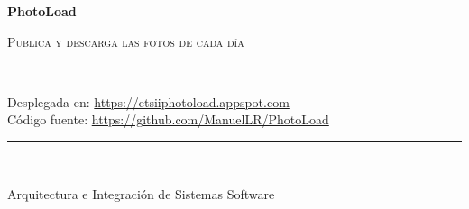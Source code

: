 \documentclass{scrartcl}
\begin{document}
\begin{titlepage}
\begin{center}
	\vspace*{-1in}
	\vspace*{2in}
	\begin{Huge}
		\textbf{PhotoLoad} \\
	\end{Huge}
	\vspace*{0.15in}	
	\begin{LARGE}
		\textsc{Publica y descarga las fotos de cada día}
	\end{LARGE}\\
	\vspace*{0.2in}	
	\begin{figure}[H]
		\centering
		\label{fig:logo}
	\end{figure}Desplegada en: \href{https://etsiiphotoload.appspot.com}{https://etsiiphotoload.appspot.com}\\Código fuente: \href{https://github.com/ManuelLR/PhotoLoad}{https://github.com/ManuelLR/PhotoLoad}
	\vspace*{0.1in}
	\rule{140mm}{0.1mm}\\
	\vspace*{0.1in}
	\begin{Large}
	Arquitectura e Integración de Sistemas Software\\	

\end{Large}
\end{center}
\end{titlepage}
\end{document}
